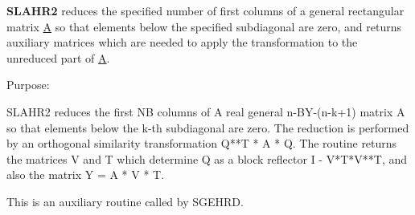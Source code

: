 {\bfseries S\+L\+A\+H\+R2} reduces the specified number of first columns of a general rectangular matrix \hyperlink{classA}{A} so that elements below the specified subdiagonal are zero, and returns auxiliary matrices which are needed to apply the transformation to the unreduced part of \hyperlink{classA}{A}. 

 \begin{DoxyParagraph}{Purpose\+: }
\begin{DoxyVerb} SLAHR2 reduces the first NB columns of A real general n-BY-(n-k+1)
 matrix A so that elements below the k-th subdiagonal are zero. The
 reduction is performed by an orthogonal similarity transformation
 Q**T * A * Q. The routine returns the matrices V and T which determine
 Q as a block reflector I - V*T*V**T, and also the matrix Y = A * V * T.

 This is an auxiliary routine called by SGEHRD.\end{DoxyVerb}
 
\end{DoxyParagraph}

